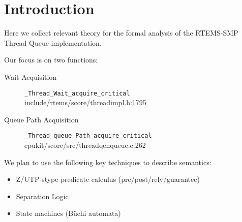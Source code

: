\section{Introduction}

Here we collect relevant theory
for the formal analysis of the RTEMS-SMP Thread Queue implementation.

Our focus is on two functions:
\begin{description}
  \item [Wait Acquisition] \verb"_Thread_Wait_acquire_critical"
    \\ include/rtems/score/threadimpl.h:1795
  \item [Queue Path Acquisition] \verb"_Thread_queue_Path_acquire_critical"
    \\ cpukit/score/src/threadqenqueue.c:262
\end{description}


We plan to use the following key techniques to describe semantics:
\begin{itemize}
  \item Z/UTP-stype predicate calculus (pre/post/rely/guarantee)
  \item Separation Logic
  \item State machines (B\"{u}chi automata)
\end{itemize}
